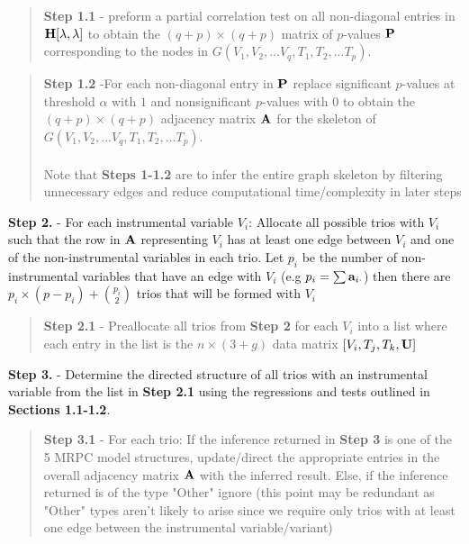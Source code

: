 \documentclass[12pt]{report}
\begin{document}
\begin{quote}
\textbf{Step 1.1} - preform a partial correlation test on all non-diagonal entries in ${\bf H}[\lambda, \lambda]$ to obtain the $(q+p) \times (q+p)$ matrix of $p$-values ${\bf P}$ corresponding to the nodes in  $G(V_1, V_2,...V_q, T_1, T_2, ... T_p)$. 
\end{quote}

\begin{quote}
\textbf{Step 1.2} -For each non-diagonal entry in $\bf P$ replace significant $p$-values at threshold $\alpha$ with $1$ and nonsignificant $p$-values with $0$ to obtain the $(q+p) \times (q+p)$ adjacency matrix $\bf A$ for the skeleton of $G(V_1, V_2,...V_q, T_1, T_2, ... T_p)$. \\
\\
Note that \textbf{Steps 1-1.2} are to infer the entire graph skeleton by filtering unnecessary edges and reduce computational time/complexity in later steps
\end{quote}

\noindent \textbf{Step 2.} - For each instrumental variable $V_i$: Allocate all possible trios with $V_i$ such that the row in $\bf A$ representing $V_i$ has at least one edge between $V_i$ and one of the non-instrumental variables in each trio. Let $p_i$ be the number of non-instrumental variables that have an edge with $V_i$ (e.g $p_i = \sum {\bf a}_{i\cdot}$) then there are $p_i \times (p-p_i)+{p_i\choose2}$ trios that will be formed with $V_i$  \\

\begin{quote}
\textbf{Step 2.1} -  Preallocate all trios from \textbf{Step 2} for each $V_i$ into a list where each entry in the list is the $n\times(3 +g)$ data matrix $[V_i,T_j,T_k, \bf{U}]$
\end{quote}

\noindent \textbf{Step 3.} - Determine the directed structure of all trios with an instrumental variable from the list in \textbf{Step 2.1} using the regressions and tests outlined in \textbf{Sections 1.1-1.2}. \\

\begin{quote}
\textbf{Step 3.1} - For each trio: If the inference returned in \textbf{Step 3} is one of the 5 MRPC model structures, update/direct the appropriate entries in the overall adjacency matrix $\bf A$ with the inferred result. Else, if the inference returned is of the type "Other" ignore (this point may be redundant as "Other" types aren't likely to arise since we require only trios with at least one edge between the instrumental variable/variant) 
\end{quote}
\end{document}
